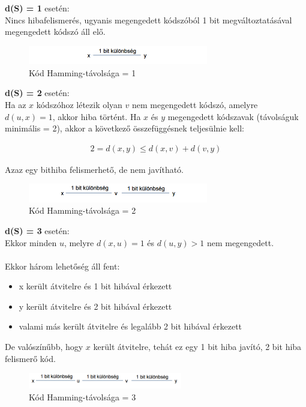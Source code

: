 \documentclass[12pt]{article}
\begin{document}
    \noindent \textbf{d(S) = 1} esetén:\\

    \noindent Nincs hibafelismerés, ugyanis megengedett kódszóból 1 bit megváltoztatásával megengedett kódszó áll elő.
    \begin{figure}[H]
    	\centering
    	\includegraphics[width=0.7\textwidth]{img/hamming1.png}
    	\caption{Kód Hamming-távolsága = 1}	
    \end{figure}
\newpage
    \noindent \textbf{d(S) = 2} esetén:\\

    \noindent Ha az $x$ kódszóhoz létezik olyan $v$ nem megengedett kódszó, amelyre $d(u,x)=1$, akkor hiba történt. Ha $x$ és $y$ megengedett kódszavak (távolságuk minimális = 2), akkor a következő összefüggésnek teljesülnie kell:

    \begin{align*}
        2 = d(x,y) \leq d(x,v)+d(v,y)
    \end{align*}

    \noindent Azaz egy bithiba felismerhető, de nem javítható.

    \begin{figure}[H]
    	\centering
    	\includegraphics[width=0.7\textwidth]{img/hamming2.png}
    	\caption{Kód Hamming-távolsága = 2}	
    \end{figure}

    \noindent \textbf{d(S) = 3} esetén:\\

    \noindent Ekkor minden $u$, melyre $d(x,u)=1$ és $d(u,y) > 1$ nem megengedett.\\\\
    Ekkor három lehetőség áll fent:
    \begin{itemize}[leftmargin=7.5mm]
        \renewcommand{\labelitemi}{$\vcenter{\hbox{\tiny$\bullet$}}$}
        \item x került átvitelre és 1 bit hibával érkezett
    	\item y került átvitelre és 2 bit hibával érkezett
    	\item valami más került átvitelre és legalább 2 bit hibával érkezett
    \end{itemize}
    De valószínűbb, hogy $x$ került átvitelre, tehát ez egy 1 bit hiba javító, 2 bit hiba felismerő kód.
    \begin{figure}[H]
    	\centering
    	\includegraphics[width=0.6\textwidth]{img/hamming3.png}
    	\caption{Kód Hamming-távolsága = 3}	
    \end{figure}
\end{document}
